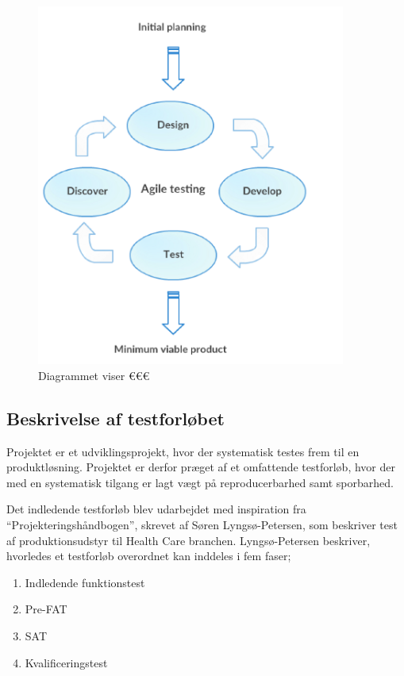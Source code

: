			\begin{figure}[htb]
			\centering
				\includegraphics[width=4in]{AgileTesting}
				\caption{Diagrammet viser €€€}	
				\label{fig:agiletesting}
			\end{figure}

\subsection{Beskrivelse af testforløbet}


Projektet er et udviklingsprojekt, hvor der systematisk testes frem til en produktløsning. Projektet er derfor præget af et omfattende testforløb, hvor der med en systematisk tilgang er lagt vægt på reproducerbarhed samt sporbarhed. 


Det indledende testforløb blev udarbejdet med inspiration fra “Projekteringshåndbogen”, skrevet af Søren Lyngsø-Petersen, som beskriver test af produktionsudstyr til Health Care branchen. Lyngsø-Petersen beskriver, hvorledes et testforløb overordnet kan inddeles i fem faser;  

	\begin{enumerate}
		\item Indledende funktionstest
		\item Pre-FAT
		\item SAT
		\item Kvalificeringstest
	\end{enumerate}


